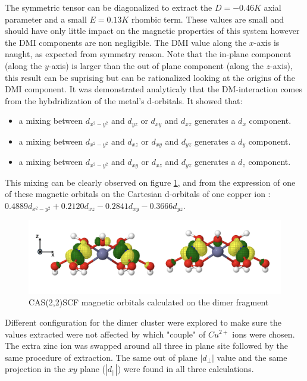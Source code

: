 \documentclass[10pt]{report}
\numberwithin{equation}{section}
\begin{document}
The symmetric tensor can be diagonalized to extract the $ D = - 0.46 K $ axial parameter and a small $ E = 0.13 K$ rhombic term. These values are small and should have only little impact on the magnetic properties of this system however the DMI components are non negligible. 
The DMI value along the $x$-axis is naught, as expected from symmetry reason. 
Note that the in-plane component (along the $y$-axis) is larger than the out of plane component (along the $z$-axis), this result can be suprising but can be rationalized looking at the origins of the DMI component.
It was demonstrated analyticaly that the DM-interaction comes from the hybdridization of the metal's d-orbitals. 
It showed that:
\begin{itemize}
    \item a mixing between $ d_{x^2-y^2}$ and $ d_{yz}$ or $ d_{xy}$ and $d_{xz}$ generates a $ d_{x}$ component.
    \item a mixing between $d_{x^2-y^2}$ and $ d_{xz}$ or $ d_{xy}$ and $d_{yz}$ generates a $ d_{y}$ component.
    \item a mixing between $ d_{x^2-y^2}$ and $d_{xy}$ or $ d_{xz}$ and $d_{yz}$ generates a $ d_{z}$ component.
\end{itemize}

This mixing can be clearly observed on figure \ref{CAS22}, and from the expression of one of these magnetic orbitals on the Cartesian
d-orbitals of one copper ion : $0.4889d_{x^2-y^2}+0.2120d_{xz}-0.2841d_{xy}-0.3666d_{yz}$.

\begin{figure}[h!]
    \centering
    \includegraphics[width=\textwidth]{Images/CAS22.png}
    \caption{CAS(2,2)SCF magnetic orbitals calculated on the dimer fragment}
    \label{CAS22}
\end{figure}


Different configuration for the dimer cluster were explored to make sure the values extracted were not affected by which "couple" of $Cu^{2+}$ ions were chosen. 
The extra zinc ion was swapped around all three in plane site followed by the same procedure of extraction. 
The same out of plane $|d_{\perp}|$ value and the same projection in the $xy$ plane ($|d_{\parallel}|$) were found in all three calculations.
\end{document}
